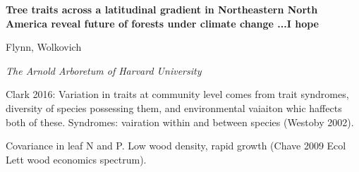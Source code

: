 \documentclass{article}
\begin{document}
\linenumbers
 

\flushleft

\textbf{\large{Tree traits across a latitudinal gradient in Northeastern North America reveal future of forests under climate change} \small{ ...I hope}}

Flynn, Wolkovich

\textit{The Arnold Arboretum of Harvard University}



Clark 2016: Variation in traits at community level comes from trait syndromes, diversity of species possessing them, and environmental vaiaiton whic haffects both of these. Syndromes: vairation within and between species (Westoby 2002).

Covariance in leaf N and P. 
Low wood density, rapid growth (Chave 2009 Ecol Lett wood economics spectrum).
\end{document}
